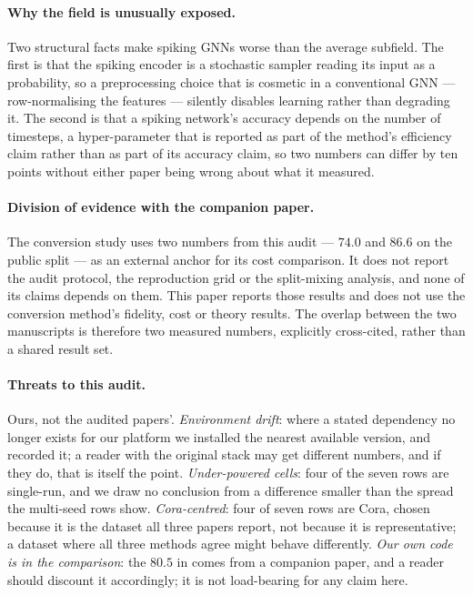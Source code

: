 \paragraph{Why the field is unusually exposed.} Two structural facts make spiking GNNs worse than the
average subfield. The first is that the spiking encoder is a stochastic sampler reading its input as a
probability, so a preprocessing choice that is cosmetic in a conventional GNN --- row-normalising the
features --- silently disables learning rather than degrading it. The second is that a spiking
network's accuracy depends on the number of timesteps, a hyper-parameter that is reported as part of
the method's efficiency claim rather than as part of its accuracy claim, so two numbers can differ by
ten points without either paper being wrong about what it measured.

\paragraph{Division of evidence with the companion paper.} The conversion study \citep{companion}
uses two numbers from this audit --- $74.0$ and $86.6$ on the public split --- as an external anchor
for its cost comparison. It does not report the audit protocol, the reproduction grid or the
split-mixing analysis, and none of its claims depends on them. This paper reports those results and
does not use the conversion method's fidelity, cost or theory results. The overlap between the two
manuscripts is therefore two measured numbers, explicitly cross-cited, rather than a shared result
set.

\paragraph{Threats to this audit.} Ours, not the audited papers'. \emph{Environment drift}: where a
stated dependency no longer exists for our platform we installed the nearest available version, and
recorded it; a reader with the original stack may get different numbers, and if they do, that is
itself the point. \emph{Under-powered cells}: four of the seven rows are single-run, and we draw no
conclusion from a difference smaller than the spread the multi-seed rows show. \emph{Cora-centred}:
four of seven rows are Cora, chosen because it is the dataset all three papers report, not because it
is representative; a dataset where all three methods agree might behave differently. \emph{Our own
code is in the comparison}: the $80.5$ in  comes from a companion paper, and a
reader should discount it accordingly; it is not load-bearing for any claim here.


